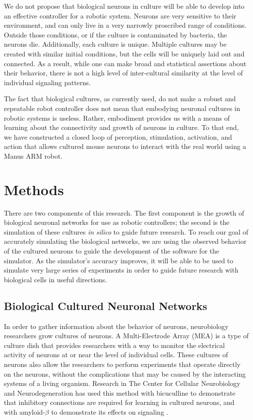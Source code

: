 \documentclass[letterpaper]{article}
\begin{document}
We do not propose that biological neurons in culture will be able to develop into an effective controller for a robotic system.
Neurons are very sensitive to their environment, and can only live in a very narrowly proscribed range of conditions. 
Outside those conditions, or if the culture is contaminated by bacteria, the neurons die. 
Additionally, each culture is unique. Multiple cultures may be created with similar initial conditions, but the cells will be uniquely laid out and connected. 
As a result, while one can make broad and statistical assertions about their behavior, there is not a high level of inter-cultural similarity at the level of individual signaling patterns. 

The fact that biological cultures, as currently used, do not make a robust and repeatable robot controller does not mean that embodying neuronal cultures in robotic systems is useless. 
Rather, embodiment provides us with a means of learning about the connectivity and growth of neurons in culture. 
To that end, we have constructed a closed loop of perception, stimulation, activation, and action that allows cultured mouse neurons to interact with the real world using a Manus ARM robot.

\section{Methods}

There are two components of this research. 
The first component is the growth of biological neuronal networks for use as robotic controllers; the second is the simulation of these cultures \textit{in silico} to guide future research. 
To reach our goal of accurately simulating the biological networks, we are using the observed behavior of the cultured neurons to guide the development of the software for the simulator.
As the simulator's accuracy improves, it will be able to be used to simulate very large series of experiments in order to guide future research with biological cells in useful directions. 

\subsection{Biological Cultured Neuronal Networks}

In order to gather information about the behavior of neurons, neurobiology researchers grow cultures of neurons.
A Multi-Electrode Array (MEA) is a type of culture dish that provides researchers with a way to monitor the electrical activity of neurons at or near the level of individual cells. 
These cultures of neurons also allow the researchers to perform experiments that operate directly on the neurons, without the complications that may be caused by the interacting systems of a living organism. 
Research in The Center for Cellular Neurobiology and Neurodegeneration has used this method with bicuculline to demonstrate that inhibitory connections are required for learning in cultured neurons, and with amyloid-$\beta$ to demonstrate its effects on signaling \cite{lee2013rapid,shea2009optimization}. 
\end{document}

